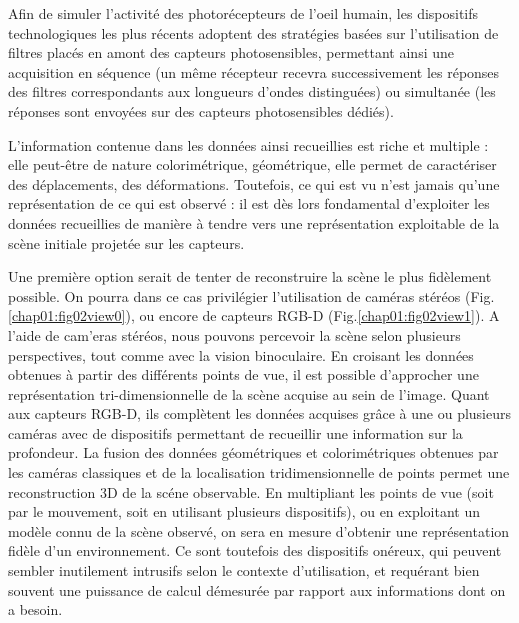 Afin de simuler l'activité des photorécepteurs de l'oeil humain, les 
dispositifs technologiques les plus récents adoptent des stratégies basées sur 
l'utilisation de filtres placés en amont des capteurs photosensibles, 
permettant 
ainsi une acquisition en séquence (un même récepteur recevra successivement les 
réponses des filtres correspondants aux longueurs d'ondes distinguées) ou 
simultanée (les réponses sont envoyées sur des capteurs photosensibles dédiés).
  
L'information contenue dans les données ainsi recueillies est riche et multiple 
: elle peut-être de nature colorimétrique, géométrique, elle permet de 
ca\-ractériser des déplacements, des déformations. Toutefois, ce qui est vu 
n'est jamais qu'une représentation de ce qui est observé : il est d\`es lors 
fondamental d'exploiter les donn\'ees recueillies de mani\`ere \`a tendre 
vers une repr\'esentation exploitable de la scène initiale projetée sur les 
capteurs.

Une premi\`ere option serait de tenter de reconstruire la sc\`ene le plus 
fid\`element possible. On pourra dans ce cas privil\'egier l'utilisation de 
cam\'eras st\'er\'eos (Fig.\ref{chap01:fig02view0})\cite{brandou2006}, ou encore de capteurs RGB-D (Fig.\ref{chap01:fig02view1})\cite{siradjuddin2012}. A l'aide de cam'eras st\'er\'eos, nous pouvons percevoir la sc\`ene selon plusieurs perspectives, 
tout comme avec la vision binoculaire. En croisant les donn\'ees obtenues \`a 
partir des diff\'erents points de vue, il est possible d'approcher une 
repr\'esentation tri-dimensionnelle de la sc\`ene acquise au sein de l'image. 
Quant aux capteurs RGB-D, ils compl\`etent les donn\'ees acquises gr\^ace \`a 
une ou plusieurs cam\'eras avec de dispositifs permettant de recueillir une 
information sur la profondeur. La fusion des donn\'ees g\'eom\'etriques et 
colorim\'etriques obtenues par les cam\'eras classiques et de la localisation 
tridimensionnelle de points permet une reconstruction 3D de la sc\'ene 
observable. En multipliant les points de vue (soit par le mouvement, soit en 
utilisant plusieurs dispositifs), ou en exploitant un mod\`ele connu de la 
sc\`ene observ\'e, on sera en mesure d'obtenir une repr\'esentation fid\`ele 
d'un environnement. Ce sont toutefois des dispositifs on\'ereux, qui peuvent 
sembler inutilement intrusifs selon le contexte d'utilisation, et requ\'erant 
bien souvent une puissance de calcul d\'emesur\'ee par rapport aux informations 
dont on a besoin.

